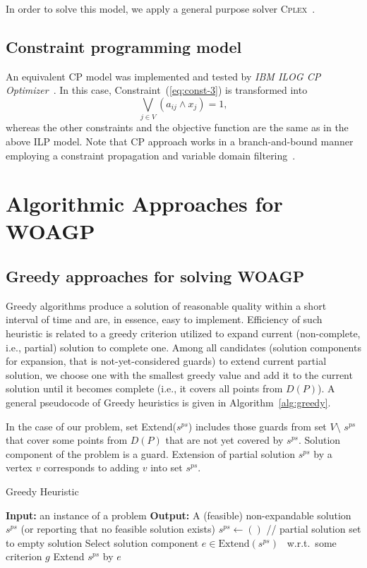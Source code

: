 \documentclass[runningheads,a4paper]{elsarticle}
\begin{document}
	In order to solve this model, we apply a general purpose solver \textsc{Cplex}~\cite{lima2010ibm}.
	\subsection{Constraint programming model} An equivalent CP model was implemented and tested by \textit{IBM ILOG CP Optimizer}~\cite{laborie2018ibm}. In this case,  Constraint~(\ref{eq:const-3}) is transformed into
	\begin{equation}
	\bigvee_{ j \in V } (a_{ij} \wedge x_j) = 1,
	\end{equation}
	whereas the other constraints and the objective function are the same as in the above ILP model. Note that CP approach works in a branch-and-bound manner employing a constraint propagation and variable domain filtering~\cite{rossi2006handbook}.
	\section{Algorithmic Approaches for WOAGP}
	\subsection{Greedy approaches for solving WOAGP}
 Greedy algorithms produce a solution of reasonable quality within a short interval of time and are, in essence, easy to implement. Efficiency of such  heuristic is related to a greedy criterion utilized to expand current (non-complete, i.e., partial) solution to complete one. Among all candidates (solution components for expansion, that is not-yet-considered guards) to extend current partial solution,  we choose one with the smallest greedy value and add it to the current solution until it becomes complete (i.e., it covers all  points from $D(P)$). A general pseudocode of Greedy heuristics is given in Algorithm~\ref{alg:greedy}.
	
	In the case of our problem, set Extend($s^{ps}$) includes those guards from set $V \setminus$ $s^{ps}$ that cover some points from $D(P)$ that are not yet covered by $s^{ps}$. Solution component of the problem is a guard. Extension of partial solution $s^{ps}$ by a vertex $v$ corresponds to adding $v$ into set $s^{ps}$. 
	
	\begin{algorithm}[!t]
		\caption{Greedy Heuristic}\label{alg:greedy}
		\begin{algorithmic}[1]
			\State \textbf{Input:} an instance of a problem
			\State \textbf{Output:} A (feasible) non-expandable solution $s^{ps}$  (or reporting that no feasible solution exists)
			\State $s^{ps} \gets ()$ \hspace{0.3cm}// partial solution set to empty solution
			\State Select solution component $e \in  \text{Extend}(s^{ps})$  \  w.r.t.\  some criterion $g$
			\State Extend $s^{ps}$ by $e$
			\EndWhile
		\end{algorithmic}
	\end{algorithm}
\end{document}
